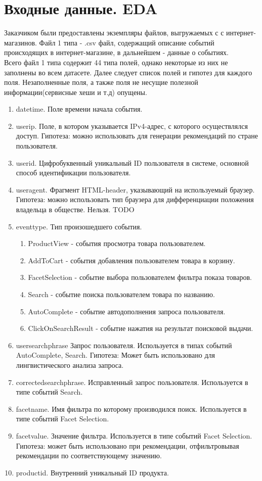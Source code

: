 \documentclass[14pt]{mmcs_article}
\newenvironment{myenumerate}
{ \begin{enumerate}
		\setlength{\itemsep}{0pt}
		\setlength{\parskip}{0pt}
		\setlength{\parsep}{0pt}     }
	{ \end{enumerate}                  }
\begin{document}
\section{Входные данные. EDA}\label{dsfs}
Заказчиком были предоставлены экземпляры файлов, выгружаемых с с интернет-магазинов. 
Файл 1 типа - .csv  файл, содержащий описание событий происходящих в интернет-магазине, в дальнейшем - данные о событиях. \\
Всего файл 1 типа содержит 44 типа полей, однако некоторые из них не заполнены во всем датасете. Далее следует список полей и гипотез для каждого поля. Незаполненные поля, а также поля не несущие полезной информации(сервисные хеши и т.д) опущены.
\begin{myenumerate}
	\item datetime. Поле времени начала события. 
	\item userip. Поле, в котором указывается IPv4-адрес, с которого осуществлялся доступ. Гипотеза: можно использовать для генерации рекомендаций по стране пользователя.
	\item userid. Цифробуквенный уникальный ID пользователя в системе, основной способ идентификации пользователя.
	\item useragent. Фрагмент HTML-header, указывающий на используемый браузер. Гипотеза: можно использовать тип браузера для дифференциации положения владельца в обществе. Нельзя. TODO
	\item eventtype. Тип произошедшего события. 
	\begin{myenumerate}
		\item ProductView - события просмотра товара пользователем. 
		\item AddToCart - события добавления пользователем товара в корзину. 
		\item FacetSelection - событие выбора пользователем фильтра показа товаров.  
		\item Search - событие поиска пользователем товара по названию.
		\item AutoComplete - событие автодополнения запроса пользователя. 
		\item ClickOnSearchResult - событие нажатия на результат поисковой выдачи. 
	\end{myenumerate}
	\item usersearchphrase Запрос пользователя. Используется в типах событий AutoComplete, Search. Гипотеза: Может быть использовано для лингвистического анализа запроса.
	\item correctedsearchphrase. Исправленный запрос пользователя. Используется в типе событий Search. 
	\item facetname. Имя фильтра по которому производился поиск. Используется в типе событий Facet Selection. 
	\item facetvalue. Значение фильтра. Используется в типе событий Facet Selection. Гипотеза: может быть использовано при рекомендации, отфильтровывая рекомендации по соответствующему значению. 
	\item productid. Внутренний уникальный ID продукта. 
\end{myenumerate}
\end{document}
